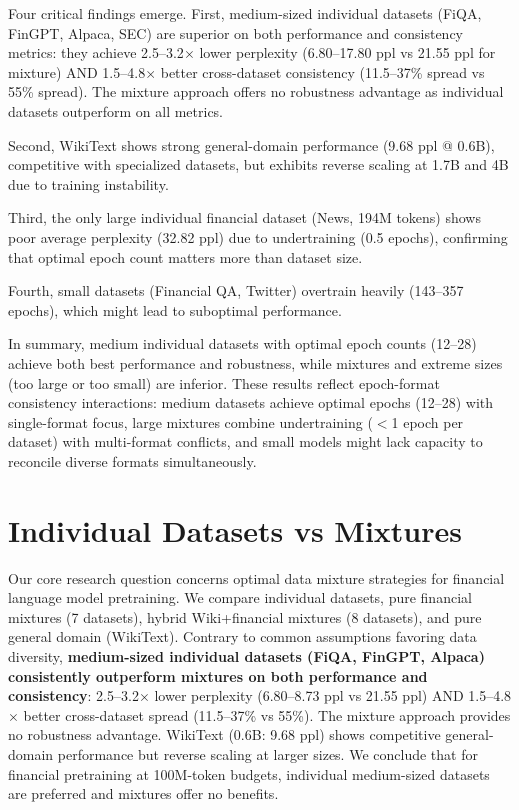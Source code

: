 Four critical findings emerge. First, {medium-sized individual datasets (FiQA, FinGPT, Alpaca, SEC) are superior on both performance and consistency metrics}: they achieve 2.5–3.2$\times$ lower perplexity (6.80–17.80 ppl vs 21.55 ppl for mixture) AND 1.5–4.8$\times$ better cross-dataset consistency (11.5–37\% spread vs 55\% spread). The mixture approach offers no robustness advantage as individual datasets outperform on all metrics. 

Second, WikiText shows strong general-domain performance (9.68 ppl @ 0.6B), competitive with specialized datasets, but exhibits reverse scaling at 1.7B and 4B due to training instability. 

Third, the only large individual financial dataset (News, 194M tokens) shows poor average perplexity (32.82 ppl) due to undertraining (0.5 epochs), confirming that optimal epoch count matters more than dataset size. 

Fourth, small datasets (Financial QA, Twitter) overtrain heavily (143–357 epochs), which might lead to suboptimal performance. 

In summary, medium individual datasets with optimal epoch counts (12–28) achieve both best performance and robustness, while mixtures and extreme sizes (too large or too small) are inferior. These results reflect epoch-format consistency interactions: medium datasets achieve optimal epochs (12–28) with single-format focus, large mixtures combine undertraining ($<$1 epoch per dataset) with multi-format conflicts, and small models might lack capacity to reconcile diverse formats simultaneously.

\section{Individual Datasets vs Mixtures}

Our core research question concerns optimal data mixture strategies for financial language model pretraining. We compare individual datasets, pure financial mixtures (7 datasets), hybrid Wiki+financial mixtures (8 datasets), and pure general domain (WikiText). Contrary to common assumptions favoring data diversity, \textbf{medium-sized individual datasets (FiQA, FinGPT, Alpaca) consistently outperform mixtures on both performance and consistency}: 2.5–3.2$\times$ lower perplexity (6.80–8.73 ppl vs 21.55 ppl) AND 1.5–4.8$\times$ better cross-dataset spread (11.5–37\% vs 55\%). The mixture approach provides no robustness advantage. WikiText (0.6B: 9.68 ppl) shows competitive general-domain performance but reverse scaling at larger sizes. We conclude that for financial pretraining at 100M-token budgets, individual medium-sized datasets are preferred and mixtures offer no benefits.

